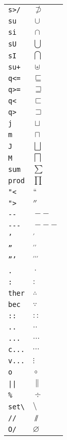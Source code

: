 \begin{longtable}{ll}
\texttt{s>/}&${}\not\supset {}$\\
\texttt{su}&${}\cup {}$\\
\texttt{si}&${}\cap {}$\\
\texttt{sU}&${}\bigcup {}$\\
\texttt{sI}&${}\bigcap {}$\\
\texttt{su+}&${}\uplus {}$\\
\texttt{q<=}&${}\sqsubseteq {}$\\
\texttt{q>=}&${}\sqsupseteq {}$\\
\texttt{q<}&${}\sqsubset {}$\\
\texttt{q>}&${}\sqsupset {}$\\
\texttt{j}&${}\sqcup {}$\\
\texttt{m}&${}\sqcap {}$\\
\texttt{J}&${}\bigsqcup {}$\\
\texttt{M}&${}\bigsqcap {}$\\
\texttt{sum}&${}\sum {}$\\
\texttt{prod}&${}\prod {}$\\
\texttt{"<}&${}``{}$\\
\texttt{">}&${}''{}$\\
\texttt{{-}{-}}&${}--{}$\\
\texttt{{-}{-}{-}}&${}---{}$\\
\texttt{'}&${}^{\prime} {}$\\
\texttt{''}&${}^{\prime\prime} {}$\\
\texttt{'''}&${}^{\prime\prime\prime} {}$\\
\texttt{.}&${}\cdotp {}$\\
\texttt{:}&${}: {}$\\
\texttt{ther}&${}\therefore {}$\\
\texttt{bec}&${}\because {}$\\
\texttt{::}&${}:: {}$\\
\texttt{..}&${}.. {}$\\
\texttt{...}&${}\ldots {}$\\
\texttt{c...}&${}\cdots {}$\\
\texttt{v...}&${}\vdots {}$\\
\texttt{o}&${}\circ {}$\\
\texttt{||}&${}\| {}$\\
\texttt{\%}&${}\div {}$\\
\texttt{set\textbackslash }&${}\setminus {}$\\
\texttt{//}&${}\sslash {}$\\
\texttt{O/}&${}\varnothing {}$\\

\end{longtable}
